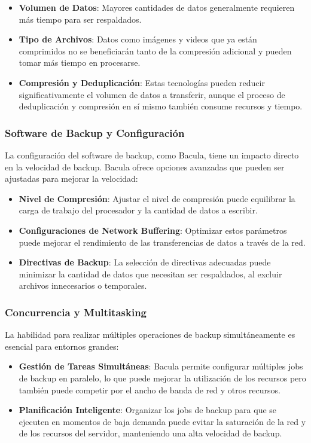 \begin{itemize}
    \item \textbf{Volumen de Datos}: Mayores cantidades de datos generalmente requieren más tiempo para ser respaldados.
    \item \textbf{Tipo de Archivos}: Datos como imágenes y videos que ya están comprimidos no se beneficiarán tanto de la compresión adicional y pueden tomar más tiempo en procesarse.
    \item \textbf{Compresión y Deduplicación}: Estas tecnologías pueden reducir significativamente el volumen de datos a transferir, aunque el proceso de deduplicación y compresión en sí mismo también consume recursos y tiempo.
\end{itemize}

\subsubsection{Software de Backup y Configuración}

La configuración del software de backup, como Bacula, tiene un impacto directo en la velocidad de backup. Bacula ofrece opciones avanzadas que pueden ser ajustadas para mejorar la velocidad:

\begin{itemize}
    \item \textbf{Nivel de Compresión}: Ajustar el nivel de compresión puede equilibrar la carga de trabajo del procesador y la cantidad de datos a escribir.
    \item \textbf{Configuraciones de Network Buffering}: Optimizar estos parámetros puede mejorar el rendimiento de las transferencias de datos a través de la red.
    \item \textbf{Directivas de Backup}: La selección de directivas adecuadas puede minimizar la cantidad de datos que necesitan ser respaldados, al excluir archivos innecesarios o temporales.
\end{itemize}

\subsubsection{Concurrencia y Multitasking}

La habilidad para realizar múltiples operaciones de backup simultáneamente es esencial para entornos grandes:

\begin{itemize}
    \item \textbf{Gestión de Tareas Simultáneas}: Bacula permite configurar múltiples jobs de backup en paralelo, lo que puede mejorar la utilización de los recursos pero también puede competir por el ancho de banda de red y otros recursos.
    \item \textbf{Planificación Inteligente}: Organizar los jobs de backup para que se ejecuten en momentos de baja demanda puede evitar la saturación de la red y de los recursos del servidor, manteniendo una alta velocidad de backup.
\end{itemize}


